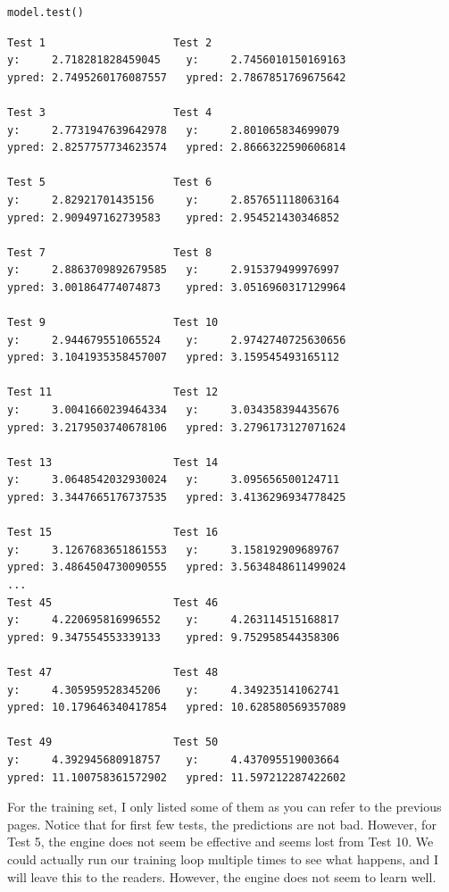 \documentclass[../../../main.tex]{subfiles}
\begin{document}
\begin{jupyter}
\begin{lstlisting}[style=jin]
model.test()
\end{lstlisting}
\begin{lstlisting}[style=jout]
Test 1                    Test 2
y:     2.718281828459045    y:     2.7456010150169163
ypred: 2.7495260176087557   ypred: 2.7867851769675642

Test 3                    Test 4
y:     2.7731947639642978   y:     2.801065834699079
ypred: 2.8257757734623574   ypred: 2.8666322590606814

Test 5                    Test 6
y:     2.82921701435156     y:     2.857651118063164
ypred: 2.909497162739583    ypred: 2.954521430346852

Test 7                    Test 8
y:     2.8863709892679585   y:     2.915379499976997
ypred: 3.001864774074873    ypred: 3.0516960317129964

Test 9                    Test 10
y:     2.944679551065524    y:     2.9742740725630656
ypred: 3.1041935358457007   ypred: 3.159545493165112

Test 11                   Test 12
y:     3.0041660239464334   y:     3.034358394435676
ypred: 3.2179503740678106   ypred: 3.2796173127071624

Test 13                   Test 14
y:     3.0648542032930024   y:     3.095656500124711
ypred: 3.3447665176737535   ypred: 3.4136296934778425

Test 15                   Test 16
y:     3.1267683651861553   y:     3.158192909689767
ypred: 3.4864504730090555   ypred: 3.5634848611499024
...
Test 45                   Test 46
y:     4.220695816996552    y:     4.263114515168817
ypred: 9.347554553339133    ypred: 9.752958544358306

Test 47                   Test 48
y:     4.305959528345206    y:     4.349235141062741
ypred: 10.179646340417854   ypred: 10.628580569357089

Test 49                   Test 50
y:     4.392945680918757    y:     4.437095519003664
ypred: 11.100758361572902   ypred: 11.597212287422602
\end{lstlisting}
\end{jupyter}

For the training set, I only listed some of them as you can
refer to the previous pages. Notice that for first few tests,
the predictions are not bad. However, for Test 5, the engine
does not seem be effective and seems lost from Test 10.
We could actually run our training loop multiple times to see
what happens, and I will leave this to the readers. However,
the engine does not seem to learn well.
\end{document}
